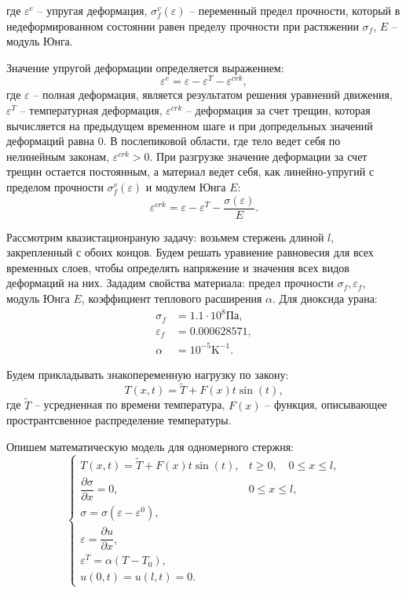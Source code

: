 \documentclass[12pt,a4paper]{article}
\begin{document}
  \noindent где $\varepsilon^e$ -- упругая деформация, $\sigma_f^v(\varepsilon)$ -- переменный предел прочности, который в недеформированном состоянии равен пределу прочности при растяжении $\sigma_f$, $E$ -- модуль Юнга.

  Значение упругой деформации определяется выражением:
  \[
    \varepsilon^e = \varepsilon - \varepsilon^T - \varepsilon^{crk},
  \]
  \noindent где 
  $\varepsilon$ -- полная деформация, является результатом решения уравнений движения, $\varepsilon^T$ -- температурная деформация, $\varepsilon^{crk}$ -- деформация за счет трещин, которая вычисляется на предыдущем временном шаге и при допредельных значений деформаций равна $0$. В послепиковой области, где тело ведет себя по нелинейным законам, $\varepsilon^{crk} > 0$. При разгрузке значение деформации за счет трещин остается постоянным, а материал ведет себя, как линейно-упругий с пределом прочности $\sigma_f^v(\varepsilon)$ и модулем Юнга $E\colon$
  \[
    \varepsilon^{crk} = \varepsilon - \varepsilon^T - \dfrac{\sigma(\varepsilon)}{E}.
  \] 

  Рассмотрим квазистационраную задачу: возьмем стержень длиной $l$, закрепленный с обоих концов. Будем решать уравнение равновесия для всех временных слоев, чтобы определять напряжение и значения всех видов деформаций на них. Зададим свойства материала: предел прочности $\sigma_f, \varepsilon_f$, модуль Юнга $E$, коэффициент теплового расширения $\alpha$. Для диоксида урана:
  \[
    \begin{split}
      \sigma_f &= 1.1 \cdot 10^8 \text{Па}, \\
      \varepsilon_f &= 0.000628571, \\
      \alpha &= 10^{-5} \text{K}^{-1}.
    \end{split}
  \]

  Будем прикладывать знакопеременную нагрузку по закону:
  \[
    T(x, t) = \widetilde{T} + F(x) t \sin(t),
  \]
  \noindent где $\widetilde{T}$ -- усредненная по времени температура, $F(x)$ -- функция, описывающее пространтсвенное распределение температуры.

  Опишем математическую модель для одномерного стержня:
  \begin{equation}
    \begin{cases}
      T(x, t) = \widetilde{T} + F(x) t \sin(t), & t \geq 0, \quad 0 \leq x \leq l, \\[0.7em]
      \dfrac{\partial \sigma}{\partial x} = 0, & 0 \leq x \leq l, \\[0.7em]
      \sigma = \sigma(\varepsilon - \varepsilon^0), \\[0.7em]
      \varepsilon = \dfrac{\partial u}{\partial x}, \\[0.7em]
      \varepsilon^T = \alpha(T - T_0), \\[0.7em]
      u(0, t) = u(l, t) = 0.
    \end{cases}
    \label{model}
  \end{equation}
\end{document}
